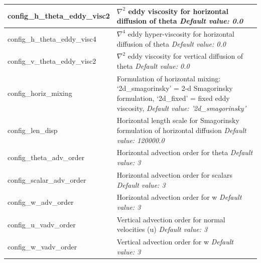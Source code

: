 \documentclass[11pt]{report}
\begin{document}
{\begin{longtable}{|p{1.75in} |p{4.5in}|}
   config\_h\_theta\_eddy\_visc2 & $\nabla^2$ eddy viscosity for horizontal diffusion of theta \newline 
   {\em Default value: 0.0} \\ \hline

   config\_h\_theta\_eddy\_visc4 & $\nabla^4$ eddy hyper-viscosity for horizontal diffusion of theta \newline 
   {\em Default value: 0.0} \\ \hline

   config\_v\_theta\_eddy\_visc2 & $\nabla^2$ eddy viscosity for vertical diffusion of theta \newline 
   {\em Default value: 0.0} \\ \hline

   config\_horiz\_mixing & Formulation of horizontal mixing: \newline
                                           `2d\_smagorinsky' = 2-d Smagorinsky formulation, \newline
                                           `2d\_fixed' = fixed eddy viscosity, \newline 
   {\em Default value: '2d\_smagorinsky'} \\ \hline

   config\_len\_disp & Horizontal length scale for Smagorinsky formulation of horizontal diffusion \newline 
   {\em Default value: 120000.0} \\ \hline

   config\_theta\_adv\_order & Horizontal advection order for theta \newline 
   {\em Default value: 3} \\ \hline

   config\_scalar\_adv\_order & Horizontal advection order for scalars \newline 
   {\em Default value: 3} \\ \hline

   config\_w\_adv\_order & Horizontal advection order for w \newline 
   {\em Default value: 3} \\ \hline

   config\_u\_vadv\_order & Vertical advection order for normal velocities (u) \newline 
   {\em Default value: 3} \\ \hline

   config\_w\_vadv\_order & Vertical advection order for w \newline 
   {\em Default value: 3} \\ \hline


\end{longtable}}
\end{document}
